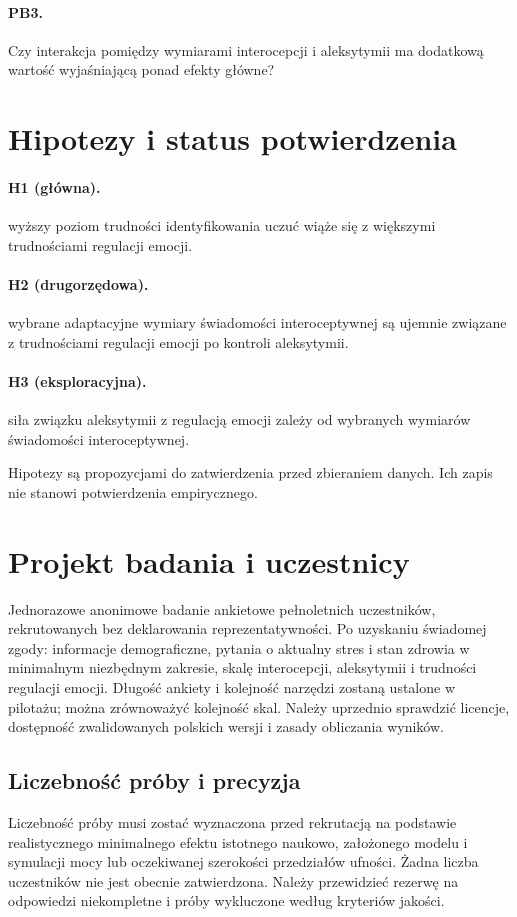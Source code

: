 \documentclass[11pt,a4paper]{article}
\begin{document}
\paragraph{PB3.} Czy interakcja pomiędzy wymiarami interocepcji i aleksytymii ma dodatkową wartość wyjaśniającą ponad efekty główne?

\section{Hipotezy i status potwierdzenia}
\paragraph{H1 (główna).} wyższy poziom trudności identyfikowania uczuć wiąże się z większymi trudnościami regulacji emocji.

\paragraph{H2 (drugorzędowa).} wybrane adaptacyjne wymiary świadomości interoceptywnej są ujemnie związane z trudnościami regulacji emocji po kontroli aleksytymii.

\paragraph{H3 (eksploracyjna).} siła związku aleksytymii z regulacją emocji zależy od wybranych wymiarów świadomości interoceptywnej.

Hipotezy są propozycjami do zatwierdzenia przed zbieraniem danych. Ich zapis nie stanowi potwierdzenia empirycznego.
\section{Projekt badania i uczestnicy}
Jednorazowe anonimowe badanie ankietowe pełnoletnich uczestników, rekrutowanych bez deklarowania reprezentatywności. Po uzyskaniu świadomej zgody: informacje demograficzne, pytania o aktualny stres i stan zdrowia w minimalnym niezbędnym zakresie, skalę interocepcji, aleksytymii i trudności regulacji emocji. Długość ankiety i kolejność narzędzi zostaną ustalone w pilotażu; można zrównoważyć kolejność skal. Należy uprzednio sprawdzić licencje, dostępność zwalidowanych polskich wersji i zasady obliczania wyników.
\subsection{Liczebność próby i precyzja}
Liczebność próby musi zostać wyznaczona przed rekrutacją na podstawie realistycznego minimalnego efektu istotnego naukowo, założonego modelu i symulacji mocy lub oczekiwanej szerokości przedziałów ufności. Żadna liczba uczestników nie jest obecnie zatwierdzona. Należy przewidzieć rezerwę na odpowiedzi niekompletne i próby wykluczone według kryteriów jakości.
\end{document}
